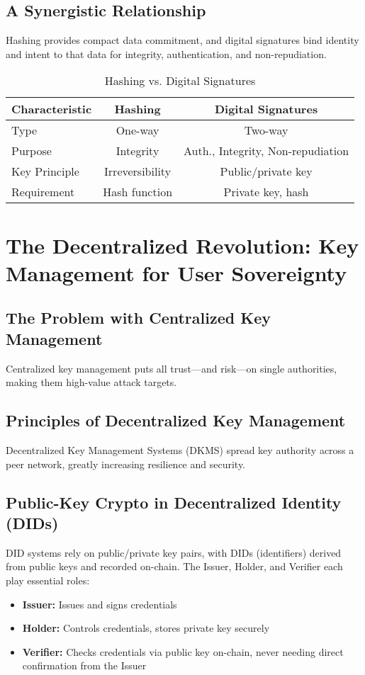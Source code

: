 \subsection{A Synergistic Relationship}
Hashing provides compact data commitment, and digital signatures bind identity and intent to that data for integrity, authentication, and non-repudiation.

\begin{table}[h]
\centering
\caption{Hashing vs. Digital Signatures}
\begin{tabular}{|l|c|c|}
\hline
\textbf{Characteristic} & \textbf{Hashing} & \textbf{Digital Signatures} \\
\hline
Type & One-way & Two-way \\
Purpose & Integrity & Auth., Integrity, Non-repudiation \\
Key Principle & Irreversibility & Public/private key \\
Requirement & Hash function & Private key, hash \\
\hline
\end{tabular}
\end{table}

\section{The Decentralized Revolution: Key Management for User Sovereignty}

\subsection{The Problem with Centralized Key Management}
Centralized key management puts all trust—and risk—on single authorities, making them high-value attack targets.

\subsection{Principles of Decentralized Key Management}
Decentralized Key Management Systems (DKMS) spread key authority across a peer network, greatly increasing resilience and security.

\subsection{Public-Key Crypto in Decentralized Identity (DIDs)}
DID systems rely on public/private key pairs, with DIDs (identifiers) derived from public keys and recorded on-chain. The Issuer, Holder, and Verifier each play essential roles:
\begin{itemize}
    \item \textbf{Issuer:} Issues and signs credentials
    \item \textbf{Holder:} Controls credentials, stores private key securely
    \item \textbf{Verifier:} Checks credentials via public key on-chain, never needing direct confirmation from the Issuer
\end{itemize}

